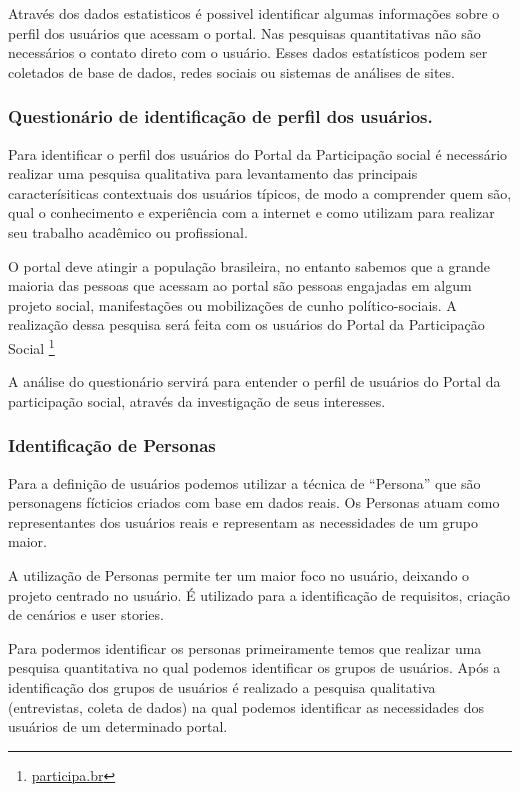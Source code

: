 	Através dos dados estatisticos é possivel identificar algumas informações sobre o perfil dos usuários que acessam o portal. Nas pesquisas quantitativas não são necessários o contato direto com o usuário. Esses dados estatísticos podem ser coletados de base de dados, redes sociais ou sistemas de análises de sites.

\subsubsection{Questionário de identificação de perfil dos usuários.}

Para identificar o perfil dos usuários do Portal da Participação social é necessário realizar uma pesquisa qualitativa para levantamento das principais caracterísiticas contextuais dos usuários típicos, de modo a comprender quem são, qual o conhecimento e experiência com a internet e como utilizam para realizar seu trabalho acadêmico ou profissional. 

O portal deve atingir a população brasileira, no entanto sabemos que a grande maioria das pessoas que acessam ao portal são pessoas engajadas em algum projeto social, manifestações ou mobilizações de cunho político-sociais. A realização dessa pesquisa será feita com os usuários do Portal da Participação Social \footnote{\url{participa.br}}

A análise do questionário servirá para entender o perfil de usuários do Portal da participação social, através da investigação de seus interesses.


\subsubsection{Identificação de Personas}

	Para a definição de usuários podemos utilizar a técnica de “Persona” que são personagens fícticios criados com base em dados reais. Os Personas atuam como representantes dos usuários reais e representam as necessidades de um grupo maior. 

	A utilização de Personas permite ter um maior foco no usuário, deixando o projeto centrado no usuário. É utilizado para a identificação de requisitos, criação de cenários e user stories. 

	Para podermos identificar os personas primeiramente temos que realizar uma pesquisa quantitativa no qual podemos identificar os grupos de usuários. Após a identificação dos grupos de usuários é realizado a pesquisa qualitativa (entrevistas, coleta de dados) na qual podemos identificar as necessidades dos usuários de um determinado portal.

